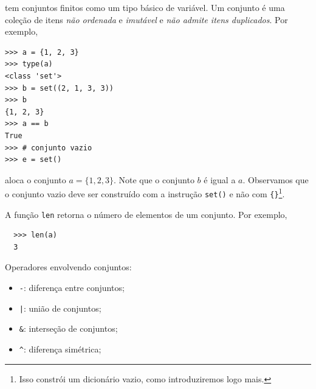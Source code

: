\documentclass[12pt]{article}
\begin{document}
{\python} tem conjuntos finitos como um tipo básico de variável. Um conjunto é uma coleção de itens \emph{não ordenada} e \emph{imutável} e \emph{não admite itens duplicados}. Por exemplo,
\begin{lstlisting}
>>> a = {1, 2, 3}
>>> type(a)
<class 'set'>
>>> b = set((2, 1, 3, 3))
>>> b
{1, 2, 3}
>>> a == b
True
>>> # conjunto vazio
>>> e = set()
\end{lstlisting}
aloca o conjunto $a = \{1,2, 3\}$. Note que o conjunto $b$ é igual a $a$. Observamos que o conjunto vazio deve ser construído com a instrução \lstinline+set()+ e não com \lstinline+{}+\footnote{Isso constrói um dicionário vazio, como introduziremos logo mais.}.

\begin{obs}
  A função {\python} \lstinline+len+ retorna o número de elementos de um conjunto. Por exemplo,
  \begin{lstlisting}
  >>> len(a)
  3
  \end{lstlisting}
\end{obs}

Operadores envolvendo conjuntos:
\begin{itemize}
\item[] \lstinline+-+: diferença entre conjuntos;
\item[] \lstinline+|+: união de conjuntos;
\item[] \lstinline+&+: interseção de conjuntos;
\item[] \lstinline+^+: diferença simétrica;
\end{itemize}
\end{document}

